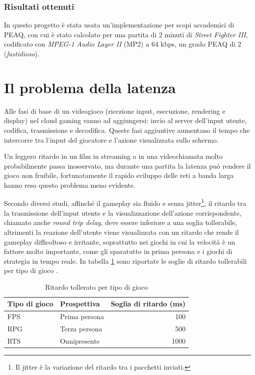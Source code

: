 \subsubsection{Risultati ottenuti}
In questo progetto è stata usata un'implementazione per scopi accademici di PEAQ, con cui è stato calcolato per una partita di 2 minuti di \textit{Street Fighter III}, codificato con \textit{MPEG-1 Audio Layer II} (MP2) a 64 kbps, un grado PEAQ di 2 (\textit{fastidioso}).




\section{Il problema della latenza} \label{sec:cap4_Latenza}
Alle fasi di base di un videogioco (ricezione input, esecuzione, rendering e display) nel cloud gaming vanno ad aggiungersi: invio al server dell'input utente, codifica, trasmissione e decodifica. Queste fasi aggiuntive aumentano il tempo che intercorre tra l'input del giocatore e l'azione visualizzata sullo schermo.

Un leggero ritardo in un film in streaming o in una videochiamata molto probabilmente passa inosservato, ma durante una partita la latenza può rendere il gioco non fruibile, fortunatamente il rapido sviluppo delle reti a banda larga hanno reso questo problema meno evidente. %

Secondo diversi studi, affinché il gameplay sia fluido e senza jitter\footnote{Il jitter è la variazione del ritardo tra i pacchetti inviati.}, il ritardo tra la trasmissione dell'input utente e la visualizzazione dell'azione corrispondente, chiamato anche \textit{round trip delay}, deve essere inferiore a una soglia tollerabile, altrimenti la reazione dell'utente viene visualizzata con un ritardo che rende il gameplay difficoltoso e irritante, soprattutto nei giochi in cui la velocità è un fattore molto importante, come gli sparatutto in prima persona e i giochi di strategia in tempo reale. In tabella \ref{table:Ritardo_tollerato_per_tipo_di_gioco} sono riportate le soglie di ritardo tollerabili per tipo di gioco \parencite{Cloud_Gaming_Architecture_and_Performance}.

\begin{table}[H]
	\centering
	\begin{tabular}{||l l r||}
		\hline
		Tipo di gioco & Prospettiva & Soglia di ritardo (ms) \\
		\hline\hline
		FPS & Prima persona & 100 \\
		\hline
		RPG & Terza persona & 500 \\
		\hline
		RTS & Onnipresente & 1000 \\
		\hline
	\end{tabular}

	\caption{Ritardo tollerato per tipo di gioco}
	\label{table:Ritardo_tollerato_per_tipo_di_gioco}
\end{table}



